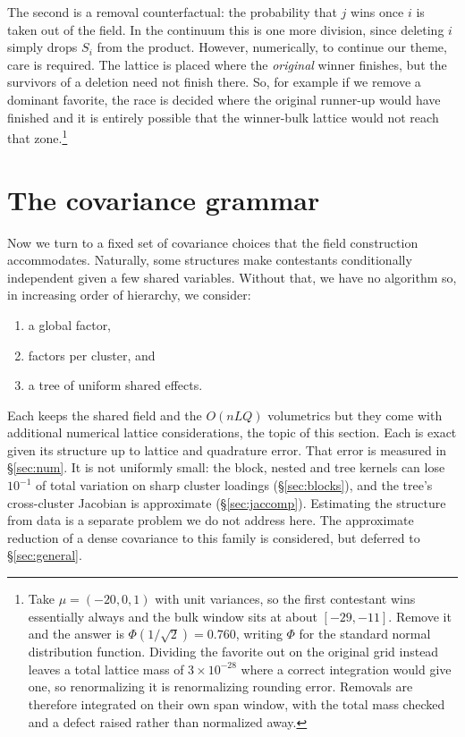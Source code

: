 \documentclass[11pt]{article}
\begin{document}
The second is a removal counterfactual: the probability that $j$ wins
once $i$ is taken out of the field. In the continuum this is one more
division, since deleting $i$ simply drops $S_i$ from the product. However, numerically, to continue our theme, care is required. The lattice is placed where the
\emph{original} winner finishes, but the survivors of a deletion need not
finish there. So, for example if we remove a dominant favorite, the race is decided where the original runner-up would have finished and it is entirely possible that the winner-bulk lattice would not reach that zone.\footnote{
Take $\mu=(-20,0,1)$ with unit variances, so the first contestant wins
essentially always and the bulk window sits at about $[-29,-11]$. Remove
it and the answer is $\Phi(1/\sqrt2)=0.760$, writing $\Phi$ for the
standard normal distribution function. Dividing the favorite out on the
original grid instead leaves a total lattice mass of $3\times10^{-28}$
where a correct integration would give one, so renormalizing it is
renormalizing rounding error. Removals are therefore integrated on their
own span window, with the total mass checked and a defect raised rather
than normalized away.}



\section{The covariance grammar}\label{sec:grammar}

Now we turn to a fixed set of covariance choices that the field construction accommodates. Naturally, some structures make contestants conditionally independent given a few shared variables. Without that, we have no algorithm so, in increasing order of hierarchy, we consider:
\begin{enumerate}
\item a global factor,
\item factors per cluster, and
\item a tree of uniform shared effects.
\end{enumerate}
Each keeps the shared
field and the $O(nLQ)$ volumetrics but they come with additional numerical lattice considerations, the topic of this section. Each is exact given its structure up to lattice and quadrature error.
That error is measured in \S\ref{sec:num}. It is not uniformly small: the
block, nested and tree kernels can lose $10^{-1}$ of total
variation on sharp cluster loadings (\S\ref{sec:blocks}), and the tree's
cross-cluster Jacobian is approximate (\S\ref{sec:jaccomp}).
Estimating the structure from data is a separate problem we do not address
here. The approximate reduction of a dense covariance to this family is considered, but deferred to \S\ref{sec:general}.
\end{document}
